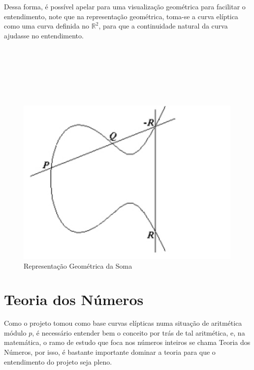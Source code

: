 \documentclass[14pt, oneside]{book}
\newcommand\tab[1][1cm]{\hspace*{#1}}
\theoremstyle{definition}
\begin{document}
\begin{enumerate}
                    Dessa forma, é possível apelar para uma visualização geométrica para facilitar o entendimento, note que na representação geométrica, toma-se a curva elíptica como uma curva definida no $\mathbb{R}^2$, para que a continuidade natural da curva ajudasse no entendimento.
                        \\
                        \\
                        \\
                        \\
                        \\
                        \\
                        \\
                    \begin{figure}
                        \centering
                        \includegraphics[scale=0.5]{geometrico.jpeg}
                        \caption{Representação Geométrica da Soma}
                        \label{fig:my_label}
                        \end{figure}
                    \end{enumerate}
                    
        \chapter{Teoria dos Números}
            \tab Como o projeto tomou como base curvas elípticas numa situação de aritmética módulo $p$, é necessário entender bem o conceito por trás de tal aritmética, e, na matemática, o ramo de estudo que foca nos números inteiros se chama Teoria dos Números, por isso, é bastante importante dominar a teoria para que o entendimento do projeto seja pleno.
                
\end{document}

